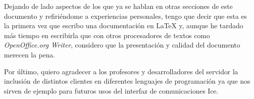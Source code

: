 Dejando de lado aspectos de los que ya se hablan en otras secciones de
este documento y refiriéndome a experiencias personales, tengo que
decir que esta es la primera vez que escribo una documentación en
\LaTeX{} y, aunque he tardado más tiempo en escribirla que con otros
procesadores de textos como \emph{{O}pen{O}ffice.org {W}riter}, considero que
la presentación y calidad del documento merecen la pena.

Por último, quiero agradecer a los profesores y desarrolladores del
servidor la inclusión de distintos clientes en diferentes lenguajes de
programación ya que nos sirven de ejemplo para futuros usos del
interfaz de comunicaciones {I}ce.